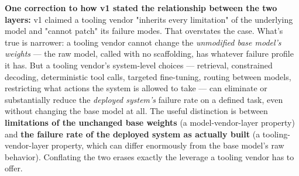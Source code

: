 \textbf{One correction to how v1 stated the relationship between the two layers:} v1 claimed a tooling vendor "inherits every limitation" of the underlying model and "cannot patch" its failure modes. That overstates the case. What's true is narrower: a tooling vendor cannot change the \emph{unmodified base model's weights} --- the raw model, called with no scaffolding, has whatever failure profile it has. But a tooling vendor's system-level choices --- retrieval, constrained decoding, deterministic tool calls, targeted fine-tuning, routing between models, restricting what actions the system is allowed to take --- can eliminate or substantially reduce the \emph{deployed system's} failure rate on a defined task, even without changing the base model at all. The useful distinction is between \textbf{limitations of the unchanged base weights} (a model-vendor-layer property) and \textbf{the failure rate of the deployed system as actually built} (a tooling-vendor-layer property, which can differ enormously from the base model's raw behavior). Conflating the two erases exactly the leverage a tooling vendor has to offer.
